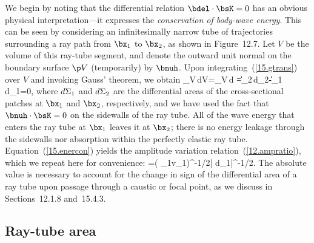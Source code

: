 We begin by noting that the differential
relation $\bdel\cdot\bsK=0$ has an obvious
physical interpretation---it expresses the {\em conservation
of body-wave energy\/}.  This can be seen by considering
an infinitesimally narrow tube of trajectories surrounding
a ray path from $\bx_1$ to $\bx_2$, as shown in Figure~12.7.
Let $V$ be the volume of this ray-tube segment, and denote
the outward unit normal on the boundary surface $\p V$
(temporarily) by $\bnuh$.  Upon integrating~(\ref{15.gtrans})
over $V$ and invoking Gauss' theorem, we obtain
\eq \label{15.enercon}
\int_V\bdel\cdot\bsK\,dV=\int_{\spar V}\bnuh\cdot\bsK\,d\/\Sigma
=\|\bsK\|_2\,d\/\Sigma_2-\|\bsK\|_1\,d\/\Sigma_1=0,
\en
where $d\/\Sigma_1$ and $d\/\Sigma_2$ are the differential
areas of the cross-sectional patches at $\bx_1$ and $\bx_2$,
respectively, and we have used the fact that $\bnuh\cdot\bsK=0$
on the sidewalls of the ray tube.  All of the wave energy that
enters the ray tube at $\bx_1$ leaves it at $\bx_2$; there is
no energy leakage through the sidewalls nor absorption within
the perfectly elastic ray tube.  Equation~(\ref{15.enercon})
yields the amplitude variation relation~(\ref{12.ampratio}),
which we repeat here for convenience:
\eq \label{15.amplaw}
=\left(
{\rho_1v_1}\right)^{-1/2}\left|
{d\/\Sigma_1}\right|^{-1/2}.
\en
The absolute value is necessary to account for the
change in sign of the differential area of a ray tube
upon passage through a caustic or focal point, as we
discuss in Sections~12.1.8 and~15.4.3.
%
%

\renewcommand{\thesubsection}{$\!\!\!\raise1.3ex\hbox{$\star$}\!\!$
\arabic{chapter}.\arabic{section}.\arabic{subsection}}
\subsection{Ray-tube area}
%
\renewcommand{\thesubsection}{\arabic{chapter}.\arabic{section}.\arabic{subsection}}

